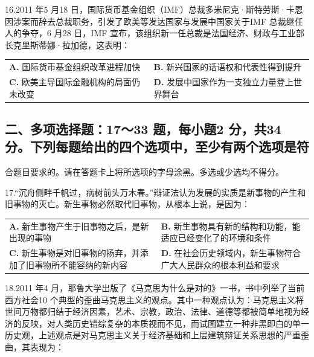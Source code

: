 \documentclass[UTF8,11pt]{ctexart}
\begin{document}
16.2011 年5 月18 日，国际货币基金组织（IMF）总裁多米尼克·斯特劳斯·卡恩因涉案而辞去总裁职务，引发了欧美等发达国家与发展中国家关于IMF 总裁继任人的争夺，6 月28 日，IMF 宣布，该组织新一任总裁是法国经济、财政与工业部长克里斯蒂娜·拉加德，这表明：


\begin{center}\begin{tabular}{>{\raggedright\arraybackslash}p{\dimexpr(\linewidth-4\tabcolsep)/2\relax}>{\raggedright\arraybackslash}p{\dimexpr(\linewidth-4\tabcolsep)/2\relax}}
\textbf{A.} 国际货币基金组织改革进程加快 & \textbf{B.} 新兴国家的话语权和代表性得到提升\\[.35em]
\textbf{C.} 欧美主导国际金融机构的局面仍未改变 & \textbf{D.} 发展中国家作为一支独立力量登上世界舞台\\[.35em]\end{tabular}\end{center}

\subsection*{二、多项选择题：17～33 题，每小题2 分，共34 分。下列每题给出的四个选项中，至少有两个选项是符}

合题目要求的。请在答题卡上将所选项的字母涂黑。多选或少选均不得分。


17.“沉舟侧畔千帆过，病树前头万木春。”辩证法认为发展的实质是新事物的产生和旧事物的灭亡。新生事物必然取代旧事物，从根本上说，是因为：


\begin{center}\begin{tabular}{>{\raggedright\arraybackslash}p{\dimexpr(\linewidth-4\tabcolsep)/2\relax}>{\raggedright\arraybackslash}p{\dimexpr(\linewidth-4\tabcolsep)/2\relax}}
\textbf{A.} 新生事物产生于旧事物之后，是新出现的事物 & \textbf{B.} 新生事物具有新的结构和功能，能适应已经变化了的环境和条件\\[.35em]
\textbf{C.} 新生事物是对旧事物的扬弃，并添加了旧事物所不能容纳的新内容 & \textbf{D.} 在社会历史领域内，新生事物符合广大人民群众的根本利益和要求\\[.35em]\end{tabular}\end{center}

18.2011 年4 月，耶鲁大学出版了《马克思为什么是对的》一书，书中列举了当前西方社会10 个典型的歪曲马克思主义的观点。其中一种观点认为：马克思主义将世间万物都归结于经济因素，艺术、宗教，政治、法律、道德等都被简单地视为经济的反映，对人类历史错综复杂的本质视而不见，而试图建立一种非黑即白的单一历史观，上述观点是对马克思主义关于经济基础和上层建筑辩证关系思想的严重歪曲，其表现为：
\end{document}
